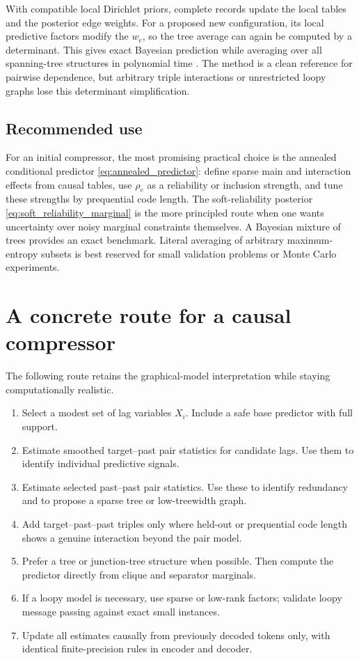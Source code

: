 \documentclass[11pt]{article}
\newcommand{\1}{\mathbf 1}
\begin{document}
With compatible local Dirichlet priors, complete records update the local
tables and the posterior edge weights.  For a proposed new configuration, its
local predictive factors modify the \(w_e\), so the tree average can again be
computed by a determinant.  This gives exact Bayesian prediction while
averaging over all spanning-tree structures in polynomial time
\cite{meila_jaakkola}.  The method is a clean reference for pairwise
dependence, but arbitrary triple interactions or unrestricted loopy graphs
lose this determinant simplification.

\subsection{Recommended use}

For an initial compressor, the most promising practical choice is the
annealed conditional predictor \eqref{eq:annealed_predictor}: define sparse
main and interaction effects from causal tables, use \(\rho_e\) as a
reliability or inclusion strength, and tune these strengths by prequential
code length.  The soft-reliability posterior
\eqref{eq:soft_reliability_marginal} is the more principled route when one
wants uncertainty over noisy marginal constraints themselves.  A Bayesian
mixture of trees provides an exact benchmark.  Literal averaging of arbitrary
maximum-entropy subsets is best reserved for small validation problems or
Monte Carlo experiments.

\section{A concrete route for a causal compressor}

The following route retains the graphical-model interpretation while staying
computationally realistic.

\begin{enumerate}
  \item Select a modest set of lag variables \(X_i\).  Include a safe base
  predictor with full support.
  \item Estimate smoothed target--past pair statistics for candidate lags.
  Use them to identify individual predictive signals.
  \item Estimate selected past--past pair statistics.  Use these to identify
  redundancy and to propose a sparse tree or low-treewidth graph.
  \item Add target--past--past triples only where held-out or prequential code
  length shows a genuine interaction beyond the pair model.
  \item Prefer a tree or junction-tree structure when possible.  Then compute
  the predictor directly from clique and separator marginals.
  \item If a loopy model is necessary, use sparse or low-rank factors; validate
  loopy message passing against exact small instances.
  \item Update all estimates causally from previously decoded tokens only, with
  identical finite-precision rules in encoder and decoder.
\end{enumerate}
\end{document}
